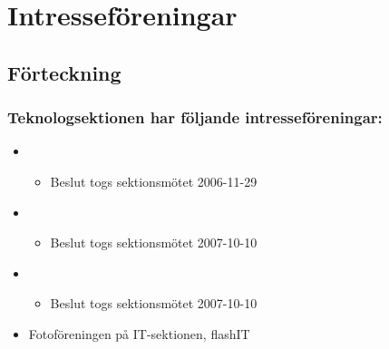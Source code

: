 \section{Intresseföreningar}

\subsection{Förteckning}

\subsubsection{Teknologsektionen har följande intresseföreningar:}

\begin{itemize}
	\item \EIGHTBITFULL{}
	\begin{itemize} 
		\item Beslut togs sektionsmötet 2006-11-29
	\end{itemize}
	\item \DRAWITFULL{}
	\begin{itemize} 
		\item Beslut togs sektionsmötet 2007-10-10
	\end{itemize}
	\item \HOOKITFULL{}
	\begin{itemize} 
		\item Beslut togs sektionsmötet 2007-10-10
	\end{itemize}
	\item Fotoföreningen på IT-sektionen, flashIT
\end{itemize}